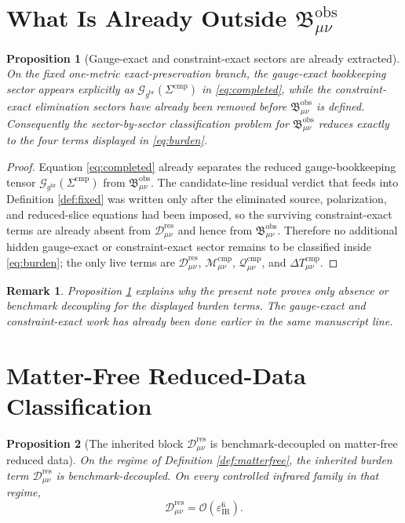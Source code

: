 \documentclass[11pt]{article}
\newcommand{\ObserverMetric}{g^{\mathrm{br}}}
\newcommand{\CompShift}{\Sigma^{\mathrm{cmp}}}
\newcommand{\ResidualDec}{\mathcal D_{\mu\nu}^{\mathrm{res}}}
\newcommand{\GaugeBook}{\mathcal G_{\ObserverMetric}}
\newcommand{\CompMix}{\mathcal M_{\mu\nu}^{\mathrm{cmp}}}
\newcommand{\CompQuad}{\mathcal Q_{\mu\nu}^{\mathrm{cmp}}}
\newcommand{\DeltaTComp}{\Delta T_{\mu\nu}^{\mathrm{cmp}}}
\newcommand{\ObsBurden}{\mathfrak B_{\mu\nu}^{\mathrm{obs}}}
\newcommand{\epsIR}{\varepsilon_{\mathrm{IR}}}
\newtheorem{proposition}{Proposition}
\newtheorem{remark}{Remark}
\begin{document}
\section{What Is Already Outside \texorpdfstring{\(\ObsBurden\)}{ObsBurden}}

\begin{proposition}[Gauge-exact and constraint-exact sectors are already extracted]
\label{prop:outside}
On the fixed one-metric exact-preservation branch, the gauge-exact bookkeeping sector appears explicitly as \(\GaugeBook(\CompShift)\) in \eqref{eq:completed}, while the constraint-exact elimination sectors have already been removed before \(\ObsBurden\) is defined. Consequently the sector-by-sector classification problem for \(\ObsBurden\) reduces exactly to the four terms displayed in \eqref{eq:burden}.
\end{proposition}

\begin{proof}
Equation \eqref{eq:completed} already separates the reduced gauge-bookkeeping tensor \(\GaugeBook(\CompShift)\) from \(\ObsBurden\). The candidate-line residual verdict that feeds into Definition \ref{def:fixed} was written only after the eliminated source, polarization, and reduced-slice equations had been imposed, so the surviving constraint-exact terms are already absent from \(\ResidualDec\) and hence from \(\ObsBurden\). Therefore no additional hidden gauge-exact or constraint-exact sector remains to be classified inside \eqref{eq:burden}; the only live terms are \(\ResidualDec\), \(\CompMix\), \(\CompQuad\), and \(\DeltaTComp\).
\end{proof}

\begin{remark}
Proposition \ref{prop:outside} explains why the present note proves only absence or benchmark decoupling for the displayed burden terms. The gauge-exact and constraint-exact work has already been done earlier in the same manuscript line.
\end{remark}

\section{Matter-Free Reduced-Data Classification}

\begin{proposition}[The inherited block \(\ResidualDec\) is benchmark-decoupled on matter-free reduced data]
\label{prop:mfres}
On the regime of Definition \ref{def:matterfree}, the inherited burden term \(\ResidualDec\) is benchmark-decoupled. On every controlled infrared family in that regime,
\begin{equation}
\ResidualDec=\mathcal O(\epsIR^6).
\label{eq:mfres}
\end{equation}
\end{proposition}
\end{document}
